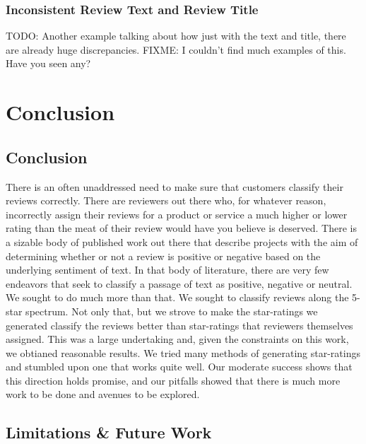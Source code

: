 \documentclass[11pt]{report} %
\begin{document}
\subsection{Inconsistent Review Text and Review Title}
TODO: Another example talking about how just with the text and title, there are already huge discrepancies.
FIXME: I couldn't find much examples of this. Have you seen any?

\chapter{Conclusion}

\section{Conclusion}
There is an often unaddressed need to make sure that customers classify their reviews correctly. There are reviewers out there who, for whatever reason, incorrectly assign their reviews for a product or service a much higher or lower rating than the meat of their review would have you believe is deserved. There is a sizable body of published work out there that describe projects with the aim of determining whether or not a review is positive or negative based on the underlying sentiment of text. In that body of literature, there are very few endeavors that seek to classify a passage of text as positive, negative or neutral. We sought to do much more than that. We sought to classify reviews along the 5-star spectrum. Not only that, but we strove to make the star-ratings we generated classify the reviews better than star-ratings that reviewers themselves assigned. This was a large undertaking and, given the constraints on this work, we obtianed reasonable results. We tried many methods of generating star-ratings and stumbled upon one that works quite well. Our moderate success shows that this direction holds promise, and our pitfalls showed that there is much more work to be done and avenues to be explored. 

\section{Limitations \& Future Work}


%


\end{document}
